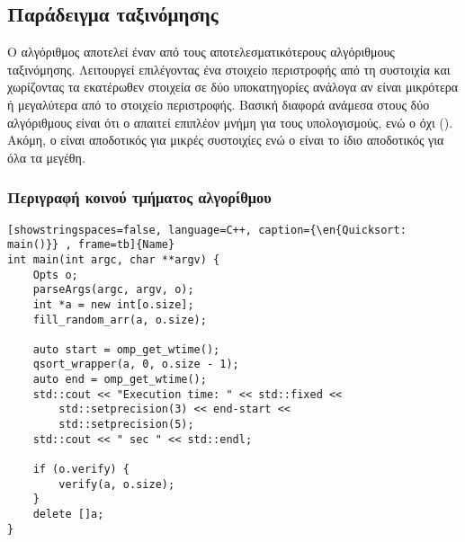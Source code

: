 \clearpage
\subsection{Παράδειγμα ταξινόμησης }
Ο αλγόριθμος  αποτελεί έναν από τους αποτελεσματικότερους αλγόριθμους ταξινόμησης. Λειτουργεί επιλέγοντας ένα στοιχείο περιστροφής από τη συστοιχία και χωρίζοντας τα εκατέρωθεν στοιχεία σε δύο υποκατηγορίες ανάλογα αν είναι μικρότερα ή μεγαλύτερα από το στοιχείο περιστροφής.
Βασική διαφορά ανάμεσα στους δύο αλγόριθμους είναι ότι ο  απαιτεί επιπλέον μνήμη για τους υπολογισμούς, ενώ ο  όχι (\emph{}). Ακόμη, ο  είναι αποδοτικός για μικρές συστοιχίες ενώ ο  είναι το ίδιο αποδοτικός για όλα τα μεγέθη.


\subsubsection{Περιγραφή κοινού τμήματος αλγορίθμου }
\begin{spacing}{1.0}
\begin{lstlisting}[showstringspaces=false, language=C++, caption={\en{Quicksort: main()}} , frame=tb]{Name}
int main(int argc, char **argv) {
    Opts o;
    parseArgs(argc, argv, o);
    int *a = new int[o.size];
    fill_random_arr(a, o.size);

    auto start = omp_get_wtime();
    qsort_wrapper(a, 0, o.size - 1);
    auto end = omp_get_wtime();
    std::cout << "Execution time: " << std::fixed <<
        std::setprecision(3) << end-start <<
        std::setprecision(5);
    std::cout << " sec " << std::endl;

    if (o.verify) {
        verify(a, o.size);
    }
    delete []a;
}
\end{lstlisting}
\end{spacing}
\clearpage

